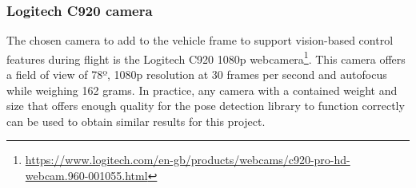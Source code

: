 \subsubsection{Logitech C920 camera}
\label{subsec:camera}

The chosen camera to add to the vehicle frame to support vision-based control features during flight is the Logitech C920 1080p webcamera\footnote{\url{https://www.logitech.com/en-gb/products/webcams/c920-pro-hd-webcam.960-001055.html}}. This camera offers a field of view of 78º, 1080p resolution at 30 frames per second and autofocus while weighing 162 grams. In practice, any camera with a contained weight and size that offers enough quality for the pose detection library to function correctly can be used to obtain similar results for this project.